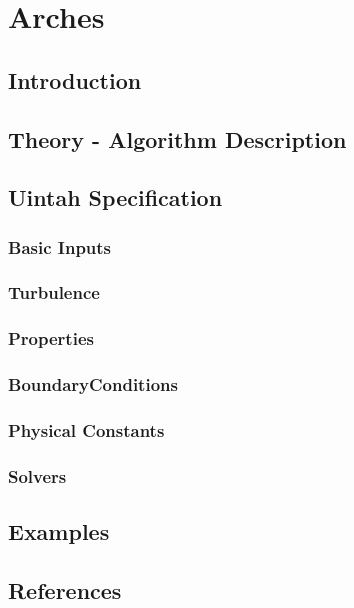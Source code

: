 
\section{Arches}

\subsection{Introduction}

\subsection{Theory - Algorithm Description}

\subsection{Uintah Specification}

\subsubsection{Basic Inputs}
\subsubsection{Turbulence}
\subsubsection{Properties}
\subsubsection{BoundaryConditions}
\subsubsection{Physical Constants}
\subsubsection{Solvers}

\subsection{Examples}

\subsection{References}
